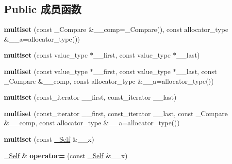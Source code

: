 \subsection*{Public 成员函数}
\begin{DoxyCompactItemize}
\item 
\mbox{\label{classmultiset_af5fd1b68dd4c35a76f0eebda4200ec52}} 
{\bfseries multiset} (const \+\_\+\+Compare \&\+\_\+\+\_\+comp=\+\_\+\+Compare(), const allocator\+\_\+type \&\+\_\+\+\_\+a=allocator\+\_\+type())
\item 
\mbox{\label{classmultiset_ae798d5c3e9d5c4a0641be81a24aeb2a7}} 
{\bfseries multiset} (const value\+\_\+type $\ast$\+\_\+\+\_\+first, const value\+\_\+type $\ast$\+\_\+\+\_\+last)
\item 
\mbox{\label{classmultiset_a8c577f22e841e50a4227638a2f546b6f}} 
{\bfseries multiset} (const value\+\_\+type $\ast$\+\_\+\+\_\+first, const value\+\_\+type $\ast$\+\_\+\+\_\+last, const \+\_\+\+Compare \&\+\_\+\+\_\+comp, const allocator\+\_\+type \&\+\_\+\+\_\+a=allocator\+\_\+type())
\item 
\mbox{\label{classmultiset_a38f983aa3e7c5b7a149e54de15727354}} 
{\bfseries multiset} (const\+\_\+iterator \+\_\+\+\_\+first, const\+\_\+iterator \+\_\+\+\_\+last)
\item 
\mbox{\label{classmultiset_ad5333cd035f9c46b774fc9f628137a3b}} 
{\bfseries multiset} (const\+\_\+iterator \+\_\+\+\_\+first, const\+\_\+iterator \+\_\+\+\_\+last, const \+\_\+\+Compare \&\+\_\+\+\_\+comp, const allocator\+\_\+type \&\+\_\+\+\_\+a=allocator\+\_\+type())
\item 
\mbox{\label{classmultiset_a052213836ade6ed6d176fdc6277b2af0}} 
{\bfseries multiset} (const \hyperlink{classmultiset}{\+\_\+\+Self} \&\+\_\+\+\_\+x)
\item 
\mbox{\label{classmultiset_ad0ad5ce6eddcf6382402c221379643e9}} 
\hyperlink{classmultiset}{\+\_\+\+Self} \& {\bfseries operator=} (const \hyperlink{classmultiset}{\+\_\+\+Self} \&\+\_\+\+\_\+x)
\item 
\mbox{\label{classmultiset_a61498e6098f1de558d98ab302cf2788a}} 

\end{DoxyCompactItemize}
